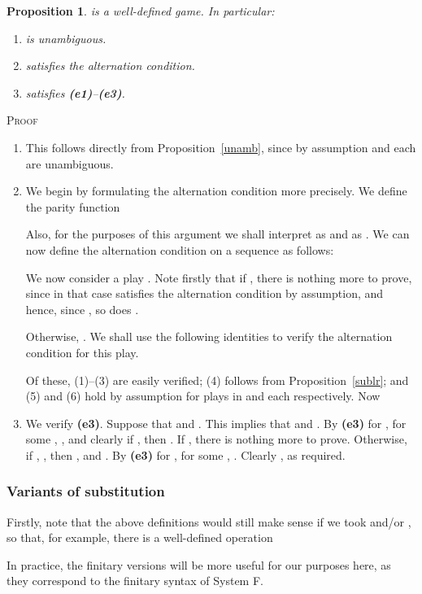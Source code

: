 \documentclass[a4paper,11pt]{article}
\newtheorem{proposition}{Proposition}[section]
\newenvironment{proof}{\textsc{Proof}\ }{}
\begin{document}
\begin{proposition}  is a well-defined game. In particular:
\begin{enumerate}
\item  is unambiguous.
\item  satisfies the alternation condition.
\item  satisfies \textbf{(e1)}--\textbf{(e3)}.
\end{enumerate}
\end{proposition}
\begin{proof}
\begin{enumerate}
\item This follows directly from Proposition~\ref{unamb}, since by assumption  and each  are unambiguous.

\item We begin by  formulating the alternation condition more precisely. We define the parity function

Also, for the purposes of this argument we shall interpret  as  and 
 as . We can now define the alternation condition on a sequence  as follows:

We now consider a play .
Note firstly that if , there is nothing more to prove, since in that case  satisfies the alternation condition by assumption, and hence, since , so does .

Otherwise, . We shall use the following identities to verify the alternation condition for this play.

Of these, (1)--(3) are easily verified; (4) follows from Proposition~\ref{sublr}; and (5) and (6) hold by assumption for plays in  and each  respectively. Now


\item We verify \textbf{(e3)}. Suppose that  and .
This implies that  and . By \textbf{(e3)} for , for
some , , and clearly if , then . If , there is nothing more to prove.
Otherwise, if , , then , and . By \textbf{(e3)} for , for some
, . Clearly , as required.
\end{enumerate}
\end{proof}

\subsubsection{Variants of substitution}
Firstly, note that the above definitions would still make sense if we
took  and/or , so that, for example, there is a
well-defined operation

In practice, the finitary versions will be more useful for our purposes
here, as they correspond to the finitary syntax of System F.
\end{document}
